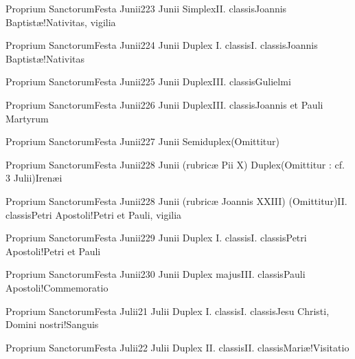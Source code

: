 \documentclass[invitatoriale-romanum.tex]{subfiles}
\begin{document}
	{Proprium Sanctorum}{Festa Junii}{2}{23 Junii}
	{Simplex}{II. classis}{Joannis Baptistæ!Nativitas, vigilia}
	{}
	{}
\invitferia

	{Proprium Sanctorum}{Festa Junii}{2}{24 Junii}
	{Duplex I. classis}{I. classis}{Joannis Baptistæ!Nativitas}
	{}
	{}

	{Proprium Sanctorum}{Festa Junii}{2}{25 Junii}
	{Duplex}{III. classis}{Gulielmi}
	{}
	{}

	{Proprium Sanctorum}{Festa Junii}{2}{26 Junii}
	{Duplex}{III. classis}{Joannis et Pauli Martyrum}
	{}
	{}

	{Proprium Sanctorum}{Festa Junii}{2}{27 Junii}
	{Semiduplex}{(Omittitur)}{}
	{}
	{\invitferia}

	{Proprium Sanctorum}{Festa Junii}{2}{28 Junii (rubricæ Pii X)}
	{Duplex}{(Omittitur : cf. 3 Julii)}{Irenæi}
	{}
	{\invitferia}

	{Proprium Sanctorum}{Festa Junii}{2}{28 Junii (rubricæ Joannis XXIII)}
	{(Omittitur)}{II. classis}{Petri Apostoli!Petri et Pauli, vigilia}
	{}
	{\invitferia}

	{Proprium Sanctorum}{Festa Junii}{2}{29 Junii}
	{Duplex I. classis}{I. classis}{Petri Apostoli!Petri et Pauli}
	{}
	{}

	{Proprium Sanctorum}{Festa Junii}{2}{30 Junii}
	{Duplex majus}{III. classis}{Pauli Apostoli!Commemoratio}
	{}
	{}



	{Proprium Sanctorum}{Festa Julii}{2}{1 Julii}
	{Duplex I. classis}{I. classis}{Jesu Christi, Domini nostri!Sanguis}
	{}
	{}

	{Proprium Sanctorum}{Festa Julii}{2}{2 Julii}
	{Duplex II. classis}{II. classis}{Mariæ!Visitatio}
	{}
	{}
\end{document}
